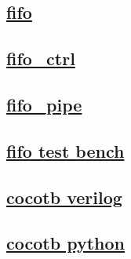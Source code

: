 \documentclass{article}
\begin{document}
  


  \subsection{\href{../files/fifo-v.html}{fifo}}

  \subsection{\href{../files/fifo_ctrl-v.html}{fifo\_ctrl}}

  \subsection{\href{../files/fifo_pipe-v.html}{fifo\_pipe}}

  \subsection{\href{../files2/tb_fifo-v.html}{fifo test bench}}

  \subsection{\href{../files2/tb_cocotb-v.html}{cocotb verilog}}

  \subsection{\href{../files2/tb_cocotb-py.html}{cocotb python}}
\end{document}
